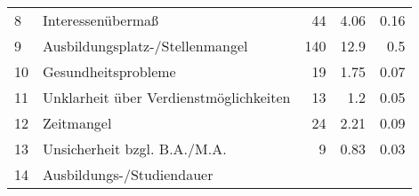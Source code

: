 \begin{longtable}{lXrrr}
     8 &
     \multicolumn{1}{X}{ Interessenübermaß   } &


       \num{44} &
       \num[round-mode=places,round-precision=2]{4.06} &
         \num[round-mode=places,round-precision=2]{0.16} \\

     9 &
     \multicolumn{1}{X}{ Ausbildungsplatz-/Stellenmangel   } &


       \num{140} &
       \num[round-mode=places,round-precision=2]{12.9} &
         \num[round-mode=places,round-precision=2]{0.5} \\

     10 &
     \multicolumn{1}{X}{ Gesundheitsprobleme   } &


       \num{19} &
       \num[round-mode=places,round-precision=2]{1.75} &
         \num[round-mode=places,round-precision=2]{0.07} \\

     11 &
     \multicolumn{1}{X}{ Unklarheit über Verdienstmöglichkeiten   } &


       \num{13} &
       \num[round-mode=places,round-precision=2]{1.2} &
         \num[round-mode=places,round-precision=2]{0.05} \\

     12 &
     \multicolumn{1}{X}{ Zeitmangel   } &


       \num{24} &
       \num[round-mode=places,round-precision=2]{2.21} &
         \num[round-mode=places,round-precision=2]{0.09} \\

     13 &
     \multicolumn{1}{X}{ Unsicherheit bzgl. B.A./M.A.   } &


       \num{9} &
       \num[round-mode=places,round-precision=2]{0.83} &
         \num[round-mode=places,round-precision=2]{0.03} \\

     14 &
     \multicolumn{1}{X}{ Ausbildungs-/Studiendauer   } &



\end{longtable}
